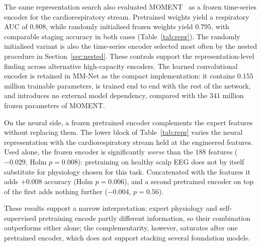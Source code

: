 \documentclass[a4paper,fleqn]{cas-sc}
\begin{document}
The same representation search also evaluated MOMENT~\cite{goswami2024moment} as a frozen
time-series encoder for the cardiorespiratory stream. Pretrained weights yield a respiratory
AUC of $0.808$, while randomly initialised frozen weights yield $0.795$, with comparable
staging accuracy in both cases (Table~\ref{tab:repr}). The randomly initialised variant is also
the time-series encoder selected most often by the nested procedure in
Section~\ref{sec:nested}. These controls support the representation-level finding across
alternative high-capacity encoders. The learned convolutional encoder is retained in MM-Net as
the compact implementation: it contains $0.155$ million trainable parameters, is trained end
to end with the rest of the network, and introduces no external model dependency, compared
with the $341$ million frozen parameters of MOMENT.

On the neural side, a frozen pretrained encoder complements the expert features without replacing them. The lower block of Table~\ref{tab:repr} varies the neural representation with the
cardiorespiratory stream held at the engineered features. Used alone, the frozen encoder is
significantly \emph{worse} than the $188$ features ($-0.029$, Holm $p=0.008$): pretraining on
healthy scalp EEG does not by itself substitute for physiology chosen for this task.
Concatenated with the features it adds $+0.008$ accuracy (Holm $p=0.006$), and a second
pretrained encoder on top of the first adds nothing further ($-0.004$, $p=0.56$).

These results support a narrow interpretation: expert physiology and self-supervised pretraining encode partly different information, so their combination outperforms either alone; the complementarity, however, saturates after one pretrained encoder, which does not support stacking several foundation models.
\end{document}
